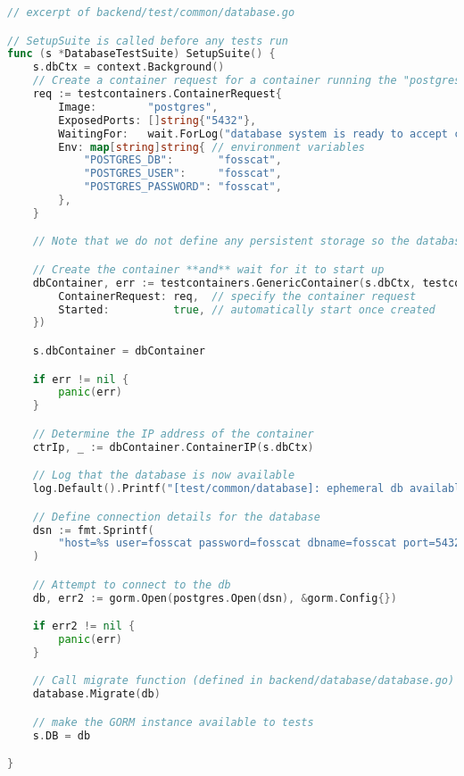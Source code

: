 \documentclass[../../main.tex]{subfiles}
\begin{document}
\begin{lstlisting}[language=Go]
// excerpt of backend/test/common/database.go

// SetupSuite is called before any tests run
func (s *DatabaseTestSuite) SetupSuite() {
	s.dbCtx = context.Background()
	// Create a container request for a container running the "postgres" image
	req := testcontainers.ContainerRequest{
		Image:        "postgres",                                                                      // container image to use
		ExposedPorts: []string{"5432"},                                                                // ports to expose to host
		WaitingFor:   wait.ForLog("database system is ready to accept connections").WithOccurrence(2), // trigger to define when container has started up
		Env: map[string]string{ // environment variables
			"POSTGRES_DB":       "fosscat",
			"POSTGRES_USER":     "fosscat",
			"POSTGRES_PASSWORD": "fosscat",
		},
	}

	// Note that we do not define any persistent storage so the database will start from scratch every time it is created.

	// Create the container **and** wait for it to start up
	dbContainer, err := testcontainers.GenericContainer(s.dbCtx, testcontainers.GenericContainerRequest{
		ContainerRequest: req,  // specify the container request
		Started:          true, // automatically start once created
	})

	s.dbContainer = dbContainer

	if err != nil {
		panic(err)
	}

	// Determine the IP address of the container
	ctrIp, _ := dbContainer.ContainerIP(s.dbCtx)

	// Log that the database is now available
	log.Default().Printf("[test/common/database]: ephemeral db available on %s:5432", ctrIp)

	// Define connection details for the database
	dsn := fmt.Sprintf(
		"host=%s user=fosscat password=fosscat dbname=fosscat port=5432", ctrIp,
	)

	// Attempt to connect to the db
	db, err2 := gorm.Open(postgres.Open(dsn), &gorm.Config{})

	if err2 != nil {
		panic(err)
	}

	// Call migrate function (defined in backend/database/database.go) to create tables
	database.Migrate(db)

	// make the GORM instance available to tests
	s.DB = db

}
\end{lstlisting}
\end{document}
